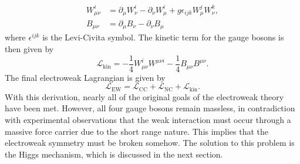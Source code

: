 \begin{align}
  W_{\mu\nu}^{i} &= \partial_{\mu}W_{\nu}^{i} - \partial_{\nu}W_{\mu}^{i} + g\epsilon_{ijk}W_{\mu}^{j}W_{\nu}^{k}, \\
  B_{\mu\nu} &= \partial_{\mu}B_{\nu} - \partial_{\nu}B_{\mu}
\end{align}
where $\epsilon^{ijk}$ is the Levi-Civita symbol. The kinetic term for the gauge bosons is then given by
\begin{equation}
  \mathcal{L}_{\mathrm{kin}} = -\frac{1}{4}W_{\mu\nu}^{i}W^{\mu\nu i} - \frac{1}{4}B_{\mu\nu}B^{\mu\nu}.
  \label{eq:ew_kinetic_lagrangian}
\end{equation}
The final electroweak Lagrangian is given by
\begin{equation}
  \mathcal{L}_{\mathrm{EW}} = \mathcal{L}_{\mathrm{CC}} + \mathcal{L}_{\mathrm{NC}} + \mathcal{L}_{\mathrm{kin}}.
  \label{eq:ew_lagrangian_final}
\end{equation}
With this derivation, nearly all of the original goals of the electroweak theory have been met. However, all four gauge bosons remain massless, in contradiction with experimental observations that the weak interaction must occur through a massive force carrier due to the short range nature. This implies that the electroweak symmetry must be broken somehow. The solution to this problem is the Higgs mechanism, which is discussed in the next section.



